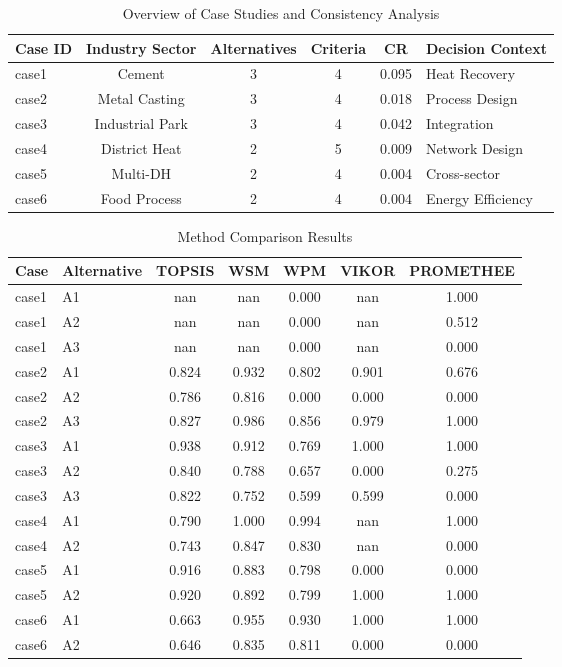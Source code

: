 
\begin{table}[htbp]
\centering
\caption{Overview of Case Studies and Consistency Analysis}
\begin{tabular}{lccccl}
\hline
Case ID & Industry Sector & Alternatives & Criteria & CR & Decision Context \\
\hline
case1 & Cement & 3 & 4 & 0.095 & Heat Recovery \\
case2 & Metal Casting & 3 & 4 & 0.018 & Process Design \\
case3 & Industrial Park & 3 & 4 & 0.042 & Integration \\
case4 & District Heat & 2 & 5 & 0.009 & Network Design \\
case5 & Multi-DH & 2 & 4 & 0.004 & Cross-sector \\
case6 & Food Process & 2 & 4 & 0.004 & Energy Efficiency \\
\hline
\end{tabular}
\label{tab:overview}
\end{table}

\begin{table}[htbp]
\centering
\caption{Method Comparison Results}
\begin{tabular}{llccccc}
\hline
Case & Alternative & TOPSIS & WSM & WPM & VIKOR & PROMETHEE \\
\hline
case1 & A1 & nan & nan & 0.000 & nan & 1.000 \\
case1 & A2 & nan & nan & 0.000 & nan & 0.512 \\
case1 & A3 & nan & nan & 0.000 & nan & 0.000 \\
case2 & A1 & 0.824 & 0.932 & 0.802 & 0.901 & 0.676 \\
case2 & A2 & 0.786 & 0.816 & 0.000 & 0.000 & 0.000 \\
case2 & A3 & 0.827 & 0.986 & 0.856 & 0.979 & 1.000 \\
case3 & A1 & 0.938 & 0.912 & 0.769 & 1.000 & 1.000 \\
case3 & A2 & 0.840 & 0.788 & 0.657 & 0.000 & 0.275 \\
case3 & A3 & 0.822 & 0.752 & 0.599 & 0.599 & 0.000 \\
case4 & A1 & 0.790 & 1.000 & 0.994 & nan & 1.000 \\
case4 & A2 & 0.743 & 0.847 & 0.830 & nan & 0.000 \\
case5 & A1 & 0.916 & 0.883 & 0.798 & 0.000 & 0.000 \\
case5 & A2 & 0.920 & 0.892 & 0.799 & 1.000 & 1.000 \\
case6 & A1 & 0.663 & 0.955 & 0.930 & 1.000 & 1.000 \\
case6 & A2 & 0.646 & 0.835 & 0.811 & 0.000 & 0.000 \\
\hline
\end{tabular}
\label{tab:rankings}
\end{table}

